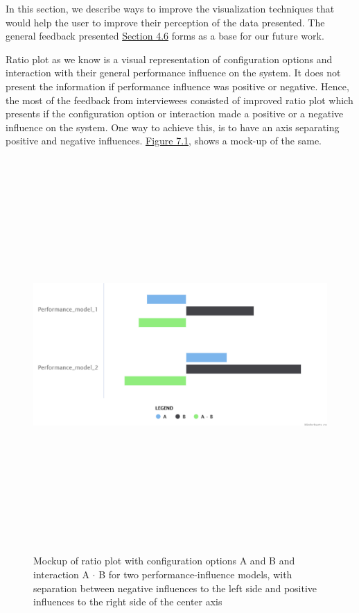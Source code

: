 \label{futurework}

In this section, we describe ways to improve the visualization techniques that would help the user to improve their perception of the data presented. The general feedback presented \hyperref[sec:4.6]{Section 4.6} forms as a base for our future work.

Ratio plot as we know is a visual representation of configuration options and interaction with their general performance influence on the system. It does not present the information if performance influence was positive or negative. Hence, the most of the feedback from interviewees consisted of improved ratio plot which presents if the configuration option or interaction made a positive or a negative influence on the system. One way to achieve this, is to have an axis separating positive and negative influences. \hyperref[positiveNegative]{Figure 7.1}, shows a mock-up of the same.

\begin{figure}[ht]
\centering
\label{positiveNegative}
\includegraphics[width=15cm,height=15cm,keepaspectratio,]{pics/ratio_plot_with_positive_negative.pdf}
\caption[mockup1]{Mockup of ratio plot with configuration options A and B and interaction A $\cdot$ B for two performance-influence models, with separation between negative influences to the left side and positive influences to the right side of the center axis}
\end{figure}


